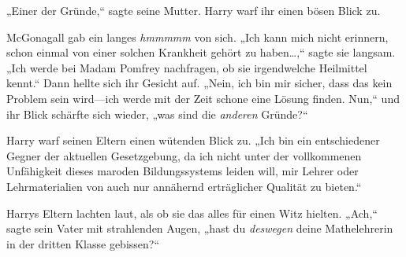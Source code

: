 „Einer der Gründe,“ sagte seine Mutter. Harry warf ihr einen bösen Blick zu.

McGonagall gab ein langes \emph{hmmmmm} von sich. „Ich kann mich nicht erinnern, schon einmal von einer solchen Krankheit gehört zu haben…,“ sagte sie langsam. „Ich werde bei Madam Pomfrey nachfragen, ob sie irgendwelche Heilmittel kennt.“ Dann hellte sich ihr Gesicht auf. „Nein, ich bin mir sicher, dass das kein Problem sein wird—ich werde mit der Zeit schone eine Lösung finden. Nun,“ und ihr Blick schärfte sich wieder, „was sind die \emph{anderen} Gründe?“

Harry warf seinen Eltern einen wütenden Blick zu. „Ich bin ein entschiedener Gegner der aktuellen Gesetzgebung, da ich nicht unter der vollkommenen Unfähigkeit dieses maroden Bildungssystems leiden will, mir Lehrer oder Lehrmaterialien von auch nur annähernd erträglicher Qualität zu bieten.“

Harrys Eltern lachten laut, als ob sie das alles für einen Witz hielten. „Ach,“ sagte sein Vater mit strahlenden Augen, „hast du \emph{deswegen} deine Mathelehrerin in der dritten Klasse gebissen?“

